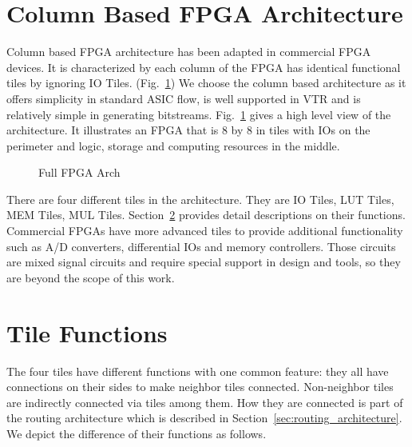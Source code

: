 \section{Column Based FPGA Architecture}
\label{sec:column_fpga_arch}

Column based FPGA architecture has been adapted in commercial FPGA devices. \cite{xilinx:v4_arch}
It is characterized by each column of the FPGA has identical functional tiles by ignoring IO Tiles. (Fig.~\ref{fig:fpga_full_arch})
We choose the column based architecture as it offers simplicity in standard ASIC flow, is well supported in VTR and is 
relatively simple in generating bitstreams. Fig.~\ref{fig:fpga_full_arch}
gives a high level view of the architecture. It illustrates an FPGA that is 8 by 8 in tiles with IOs on the perimeter
and logic, storage and computing resources in the middle. \par

\begin{figure}[htp]
	\begin{center}
		\epsfxsize=4in 
		    \renewcommand{\captionfont}{\small}
				\caption{Full FPGA Arch
				\label{fig:fpga_full_arch}}
	\end{center}
\end{figure}

There are four different tiles in the architecture. They are IO Tiles, LUT Tiles, MEM Tiles, MUL Tiles.
 Section~\ref{sec:tile_funcs} provides detail descriptions on their functions. Commercial FPGAs
 have more advanced tiles to provide additional functionality such as A/D converters, differential IOs 
and memory controllers. Those circuits are mixed signal circuits and require special support in design 
and tools, so they are beyond the scope of this work. \par

\section{Tile Functions}
\label{sec:tile_funcs}
The four tiles have different functions with one common feature: they all have connections on their sides 
to make neighbor tiles connected. Non-neighbor tiles are indirectly connected via tiles among them. How they are
connected is part of the routing architecture which is described in Section~\ref{sec:routing_architecture}. We depict the difference of
their functions as follows. \par

